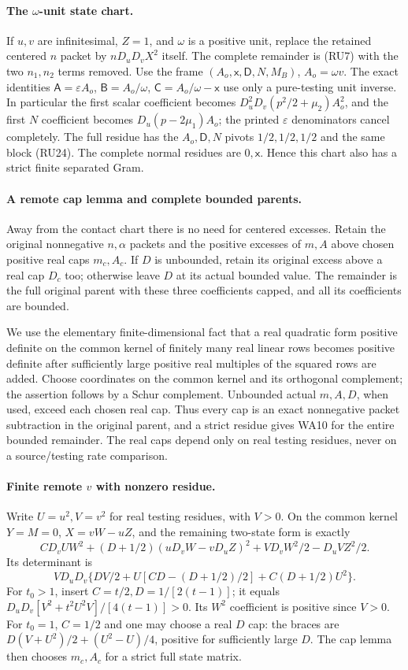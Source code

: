 \paragraph{The $\omega$-unit state chart.}
If $u,v$ are infinitesimal, $Z=1$, and $\omega$ is a positive unit,
replace the retained centered $n$ packet by $nD_uD_vX^2$ itself.
The complete remainder is (RU7) with the two $n_1,n_2$ terms removed.
Use the frame $(A_o,\mathsf x,\mathsf D,N,M_B)$, $A_o=\omega v$.
The exact identities
$\mathsf A=\varepsilon A_o$, $\mathsf B=A_o/\omega$,
$\mathsf C=A_o/\omega-\mathsf x$ use only a pure-testing unit
inverse. In particular the first scalar coefficient becomes
$D_u^2D_v(p^2/2+\mu_2)A_o^2$, and the first $N$ coefficient
becomes $D_u(p-2\mu_1)A_o$; the printed $\varepsilon$ denominators
cancel completely. The full residue has the $A_o,\mathsf D,N$
pivots $1/2,1/2,1/2$ and the same block (RU24).
The complete normal residues are $0,\mathsf x$. Hence this chart
also has a strict finite separated Gram.

\paragraph{A remote cap lemma and complete bounded parents.}
Away from the contact chart there is no need for centered excesses.
Retain the original nonnegative $n,\alpha$ packets and the positive
excesses of $m,A$ above chosen positive real caps $m_c,A_c$.
If $D$ is unbounded, retain its original excess above a real cap
$D_c$ too; otherwise leave $D$ at its actual bounded value.
The remainder is the full original parent with these three
coefficients capped, and all its coefficients are bounded.

We use the elementary finite-dimensional fact that a real quadratic
form positive definite on the common kernel of finitely many real
linear rows becomes positive definite after sufficiently large
positive real multiples of the squared rows are added. Choose
coordinates on the common kernel and its orthogonal complement;
the assertion follows by a Schur complement. Unbounded actual
$m,A,D$, when used, exceed each chosen real cap. Thus every cap
is an exact nonnegative packet subtraction in the original parent,
and a strict residue gives WA10 for the entire bounded remainder.
The real caps depend only on real testing residues, never on a
source/testing rate comparison.

\paragraph{Finite remote $v$ with nonzero residue.}
Write $U=u^2,V=v^2$ for real testing residues, with $V>0$.
On the common kernel $Y=M=0$, $X=vW-uZ$, and the remaining
two-state form is exactly
\[
 CD_vU W^2+(D+1/2)(uD_vW-vD_uZ)^2
                  +VD_vW^2/2-D_uVZ^2/2.                         \tag{RU25}
\]
Its determinant is
\[
 VD_uD_v\{DV/2+U[CD-(D+1/2)/2]+C(D+1/2)U^2\}.
 \tag{RU26}
\]
For $t_0>1$, insert $C=t/2,D=1/[2(t-1)]$; it equals
$D_uD_v[V^2+t^2U^2V]/[4(t-1)]>0$.
Its $W^2$ coefficient is positive since $V>0$.
For $t_0=1$, $C=1/2$ and one may choose a real $D$ cap: the braces
are $D(V+U^2)/2+(U^2-U)/4$, positive for sufficiently large $D$.
The cap lemma then chooses $m_c,A_c$ for a strict full state matrix.

